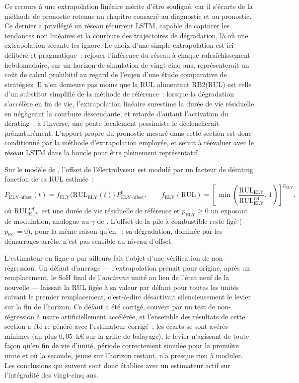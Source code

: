 Ce recours à une extrapolation linéaire mérite d'être souligné, car il s'écarte de la méthode de pronostic retenue au chapitre consacré au diagnostic et au pronostic. Ce dernier a privilégié un réseau récurrent LSTM, capable de capturer les tendances non linéaires et la courbure des trajectoires de dégradation, là où une extrapolation sécante les ignore. Le choix d'une simple extrapolation est ici délibéré et pragmatique~: rejouer l'inférence du réseau à chaque rafraîchissement hebdomadaire, sur un horizon de simulation de vingt-cinq ans, représenterait un coût de calcul prohibitif au regard de l'enjeu d'une étude comparative de stratégies. Il n'en demeure pas moins que la RUL alimentant RB2(RUL) est celle d'un substitut simplifié de la méthode de référence~: lorsque la dégradation s'accélère en fin de vie, l'extrapolation linéaire surestime la durée de vie résiduelle en négligeant la courbure descendante, et retarde d'autant l'activation du dérating~; à l'inverse, une pente localement pessimiste le déclencherait prématurément. L'apport propre du pronostic mesuré dans cette section est donc conditionné par la méthode d'extrapolation employée, et serait à réévaluer avec le réseau LSTM dans la boucle pour être pleinement représentatif.

Sur le modèle de \RBsohH, l'offset de l'électrolyseur est modulé par un facteur de dérating fonction de sa RUL estimée~:
\begin{equation}
\label{eq:rb2rul_offset}
P_{\text{ELY-offset}}(t) = f_{\text{ELY}}\!\big(\mathrm{RUL}_{\text{ELY}}(t)\big)\,P_{\text{ELY-offset}}^{0},
\qquad
f_{\text{ELY}}(\mathrm{RUL}) = \left[\,\min\!\left(\frac{\mathrm{RUL}_{\text{ELY}}}{\mathrm{RUL}^{\text{ref}}_{\text{ELY}}},\,1\right)\right]^{p_{\text{ELY}}},
\end{equation}
où $\mathrm{RUL}^{\text{ref}}_{\text{ELY}}$ est une durée de vie résiduelle de référence et $p_{\text{ELY}} \geq 0$ un exposant de modulation, analogue au $\gamma$ de \RBsohH. L'offset de la pile à combustible reste figé ($p_{\text{FC}} = 0$), pour la même raison qu'en \RBsohH~: sa dégradation, dominée par les démarrages-arrêts, n'est pas sensible au niveau d'offset.

L'estimateur en ligne a par ailleurs fait l'objet d'une vérification de non-régression. Un défaut d'ancrage — l'extrapolation prenait pour origine, après un remplacement, le SoH final de l'\emph{ancienne} unité au lieu de l'état neuf de la nouvelle — laissait la RUL figée à sa valeur par défaut pour toutes les unités suivant le premier remplacement, c'est-à-dire désactivait silencieusement le levier sur la fin de l'horizon. Ce défaut a été corrigé, couvert par un test de non-régression à usure artificiellement accélérée, et l'ensemble des résultats de cette section a été re-généré avec l'estimateur corrigé~; les écarts se sont avérés minimes (au plus $0{,}05$~k€ sur la grille de balayage), le levier n'agissant de toute façon qu'en fin de vie d'unité, période correctement simulée pour la première unité et où la seconde, jeune sur l'horizon restant, n'a presque rien à moduler. Les conclusions qui suivent sont donc établies avec un estimateur actif sur l'intégralité des vingt-cinq ans.

